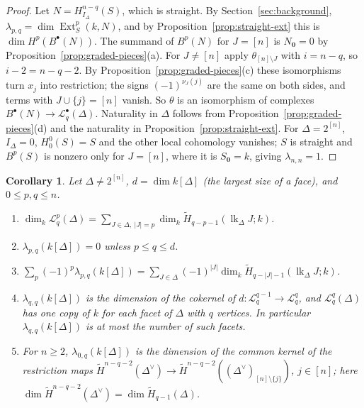 \documentclass[11pt]{article}
\theoremstyle{plain}
\newtheorem{corollary}[theorem]{Corollary}
\theoremstyle{definition}
\newcommand{\kk}{k}
\newcommand{\link}{\operatorname{lk}}
\newcommand{\Ext}{\operatorname{Ext}}
\newcommand{\rH}{\widetilde{H}}
\newcommand{\Hloc}[2]{H^{#1}_{#2}}
\newcommand{\Lc}{\mathcal L}
\begin{document}
\begin{proof}
Let $N=\Hloc{n-q}{I_\Delta}(S)$, which is straight. By Section~\ref{sec:background}, $\lambda_{p,q}=\dim\Ext^p_S(\kk,N)$,
and by Proposition~\ref{prop:straight-ext} this is $\dim H^p(B^\bullet(N))$. The summand of $B^p(N)$ for $J=[n]$ is
$N_{\mathbf 0}=0$ by Proposition~\ref{prop:graded-pieces}(a). For $J\neq[n]$ apply $\theta_{[n]\setminus J}$ with
$i=n-q$, so $i-2=n-q-2$. By Proposition~\ref{prop:graded-pieces}(c) these isomorphisms turn $x_j$ into restriction;
the signs $(-1)^{\nu_J(j)}$ are the same on both sides, and terms with $J\cup\{j\}=[n]$ vanish. So
$\theta$ is an isomorphism of complexes $B^\bullet(N)\to\Lc^\bullet_q(\Delta)$. Naturality in $\Delta$ follows from
Proposition~\ref{prop:graded-pieces}(d) and the naturality in Proposition~\ref{prop:straight-ext}. For
$\Delta=2^{[n]}$, $I_\Delta=0$, $\Hloc{0}{0}(S)=S$ and the other local cohomology vanishes; $S$ is straight and
$B^p(S)$ is nonzero only for $J=[n]$, where it is $S_{\mathbf 0}=\kk$, giving $\lambda_{n,n}=1$.
\end{proof}

\begin{corollary}\label{cor:lyub-terms}
Let $\Delta\ne2^{[n]}$, $d=\dim\kk[\Delta]$ (the largest size of a face), and $0\le p,q\le n$.
\begin{enumerate}[label=\textup{(\alph*)},nosep]
\item $\dim_\kk\Lc^p_q(\Delta)=\sum_{J\in\Delta,\ |J|=p}\dim_\kk\rH_{q-p-1}(\link_\Delta J;\kk)$.
\item $\lambda_{p,q}(\kk[\Delta])=0$ unless $p\le q\le d$.
\item $\sum_p(-1)^p\lambda_{p,q}(\kk[\Delta])=\sum_{J\in\Delta}(-1)^{|J|}\dim_\kk\rH_{q-|J|-1}(\link_\Delta J;\kk)$.
\item $\lambda_{q,q}(\kk[\Delta])$ is the dimension of the cokernel of $d\colon\Lc^{q-1}_q\to\Lc^q_q$, and
$\Lc^q_q(\Delta)$ has one copy of $\kk$ for each facet of $\Delta$ with $q$ vertices. In particular
$\lambda_{q,q}(\kk[\Delta])$ is at most the number of such facets.
\item For $n \geq 2$, $\lambda_{0,q}(\kk[\Delta])$ is the dimension of the common kernel of the restriction maps
$\rH^{n-q-2}(\Delta^\vee)\to\rH^{n-q-2}((\Delta^\vee)_{[n]\setminus\{j\}})$, $j\in[n]$; here
$\dim\rH^{n-q-2}(\Delta^\vee)=\dim\rH_{q-1}(\Delta)$.
\end{enumerate}
\end{corollary}
\end{document}
